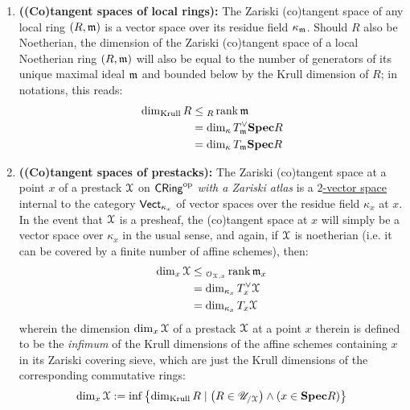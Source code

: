             \begin{proposition} \label{prop: Zariski_tangent_spaces_are_vector_spaces} 
                \noindent
                \begin{enumerate}
                    \item \textbf{\textbf{((Co)tangent spaces of local rings):}} The Zariski (co)tangent space of any local ring $(R, \mathfrak{m})$ is a vector space over its residue field $\kappa_{\mathfrak{m}}$. Should $R$ also be Noetherian, the dimension of the Zariski (co)tangent space of a local Noetherian ring $(R, \mathfrak{m})$ will also be equal to the number of generators of its unique maximal ideal $\mathfrak{m}$ and bounded below by the Krull dimension of $R$; in notations, this reads:
                        $$
                            \begin{aligned}
                                \dim_{\mathrm{Krull}} R & \leq {}_R\operatorname{rank} \mathfrak{m}
                                \\
                                & = \dim_{\kappa} T^{\vee}_{\mathfrak{m}} \mathbf{Spec} R
                                \\
                                & = \dim_{\kappa} T_{\mathfrak{m}} \mathbf{Spec} R
                            \end{aligned}
                        $$
                    \item \textbf{((Co)tangent spaces of prestacks):} The Zariski (co)tangent space at a point $x$ of a prestack $\mathcal{X}$ on $\mathsf{CRing}^{\mathrm{op}}$ \textit{with a Zariski atlas} is a \href{https://ncatlab.org/nlab/show/2-vector+space}{\underline{$2$-vector space}} internal to the category $\mathsf{Vect}_{\kappa_x}$ of vector spaces over the residue field $\kappa_x$ at $x$. In the event that $\mathcal{X}$ is a presheaf, the (co)tangent space at $x$ will simply be a vector space over $\kappa_x$ in the usual sense, and again, if $\mathcal{X}$ is noetherian (i.e. it can be covered by a finite number of affine schemes), then:
                        $$
                            \begin{aligned}
                                \dim_x \mathcal{X} & \leq {}_{\mathcal{O}_{\mathcal{X}, x}}\operatorname{rank} \mathfrak{m}_x
                                \\
                                & = \dim_{\kappa_x} T^{\vee}_x \mathcal{X}
                                \\
                                & = \dim_{\kappa_x} T_x \mathcal{X}
                            \end{aligned}
                        $$
                    wherein the dimension $\dim_x \mathcal{X}$ of a prestack $\mathcal{X}$ at a point $x$ therein is defined to be the \textit{infimum} of the Krull dimensions of the affine schemes containing $x$ in its Zariski covering sieve, which are just the Krull dimensions of the corresponding commutative rings:
                        $$\dim_x \mathcal{X} := \inf \left\{ \dim_{\mathrm{Krull}} R \mid \left(R \in \mathscr{U}_{/\mathcal{X}}\right) \wedge (x \in \mathbf{Spec} R) \right\}$$
                \end{enumerate}
            \end{proposition}
